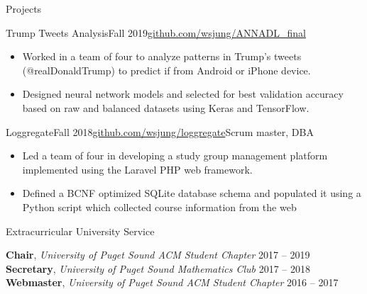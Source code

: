 \documentclass{resume} %
\begin{document}
\begin{rSection}{Projects}

\begin{rSubsection}{Trump Tweets Analysis}{Fall 2019}{\href{https://github.com/wsjung/ANNADL_final}{github.com/wsjung/ANNADL\_final}}{}
\renewcommand\labelitemi{$\cdot$}
\begin{itemize}
\setlength\itemsep{-0.25em}
\item Worked in a team of four to analyze patterns in Trump's tweets (@realDonaldTrump) to predict if from Android or iPhone device.
\item Designed neural network models and selected for best validation accuracy based on raw and balanced datasets using Keras and TensorFlow. 
\end{itemize}
\end{rSubsection}

\begin{rSubsection}{Loggregate}{Fall 2018}{\href{https://github.com/wsjung/loggregate}{github.com/wsjung/loggregate}}{Scrum master, DBA}
\renewcommand\labelitemi{$\cdot$}
\begin{itemize}
\setlength\itemsep{-0.25em}
\item Led a team of four in developing a study group management platform implemented using the Laravel PHP web framework.
\item Defined a BCNF optimized SQLite database schema and populated it using a Python script which collected course information from the web
\end{itemize}
\end{rSubsection}

\end{rSection}


\begin{rSection}{Extracurricular University Service}

{\bf Chair}, \textit{University of Puget Sound ACM Student Chapter} \hfill {2017 -- 2019} \\
{\bf Secretary}, \textit{University of Puget Sound Mathematics Club} \hfill {2017 -- 2018} \\
{\bf Webmaster}, \textit{University of Puget Sound ACM Student Chapter} \hfill {2016 -- 2017}

\end{rSection}
\end{document}
